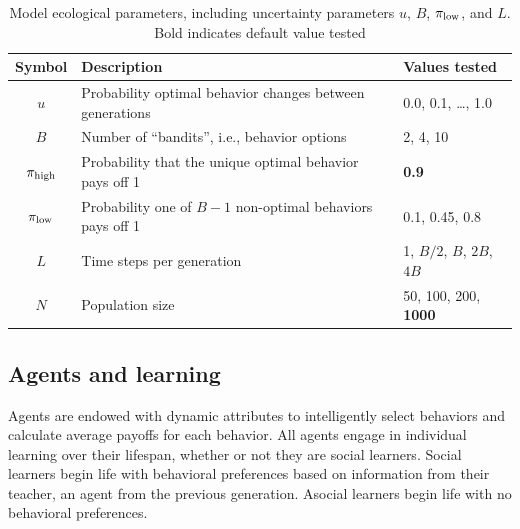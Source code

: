 \documentclass[letterpaper,11.5pt]{scrartcl}
\begin{document}
\vspace{2em}
\begin{table}[h]
\caption{Model ecological parameters, including uncertainty parameters $u$, $B$,
$\pi_{\mathrm{low}}$, and $L$. Bold indicates default value tested} %
    \label{tab:uncertaintyParameters}
    \centering %
    \begin{tabular}{cp{4.0in}p{1.25in}} \toprule

        Symbol & Description & Values tested \\ 

        \midrule  

        $u$    & Probability optimal behavior changes between generations 
               & 0.0, 0.1, \ldots, 1.0 \\

        $B$       & Number of ``bandits'', i.e., behavior options
                  & 2, 4, 10 \\

        $\pi_{\mathrm{high}}$ & Probability that the unique optimal behavior pays off 1 
                & \textbf{0.9} \\

        $\pi_{\mathrm{low}}$ & Probability one of $B - 1$ non-optimal behaviors pays off 1 
                 & 0.1, 0.45, 0.8 \\ 

        $L$    & Time steps per generation & 1, $B/2$, $B$, $2B$, $4B$ \\

        $N$    & Population size
                 & 50, 100, 200, \textbf{1000} \\
               
        \bottomrule
        \end{tabular} 
\end{table}



\subsection{Agents and learning}

Agents are endowed with dynamic attributes to intelligently select behaviors and
calculate average payoffs for each behavior. All agents engage in
individual learning over their lifespan, whether or not they are social learners.
Social learners begin life with
behavioral preferences based on information from their
teacher, an agent from the previous generation. 
Asocial learners begin life with no behavioral
preferences. 
\end{document}
